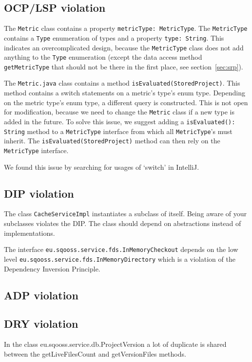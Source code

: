 \documentclass{article}
\begin{document}
\subsection{OCP/LSP violation}
The \verb|Metric| class contains a property \verb|metricType: MetricType|. The \verb|MetricType| contains a \verb|Type| enumeration of types and a property \verb|type: String|. This indicates an overcomplicated design, because the \verb|MetricType| class does not add anything to the \verb|Type| enumeration (except the data access method \verb|getMetricType| that should not be there in the first place, see section~\ref{sec:srp}).

The \verb|Metric.java| class contains a method \verb|isEvaluated(StoredProject)|. This method contains a switch statements on a metric's type's enum type. Depending on the metric type's enum type, a different query is constructed. This is not open for modification, because we need to change the \verb|Metric| class if a new type is added in the future. To solve this issue, we suggest adding a \verb|isEvaluated(): String| method to a \verb|MetricType| interface from which all \verb|MetricType|'s must inherit. The \verb|isEvaluated(StoredProject)| method can then rely on the \verb|MetricType| interface.

We found this issue by searching for usages of `switch' in IntelliJ.

\subsection{DIP violation}
The class \verb|CacheServiceImpl| instantiates a subclass of itself. Being aware of your subclasses violates the DIP. The class should depend on abstractions instead of implementations.

The interface \verb|eu.sqooss.service.fds.InMemoryCheckout| depends on the low level \verb|eu.sqooss.service.fds.InMemoryDirectory| which is a violation of the Dependency Inversion Principle. %

\subsection{ADP violation}

\subsection{DRY violation}
In the class eu.sqooss.service.db.ProjectVersion a lot of duplicate is shared between the getLiveFilesCount and getVersionFiles methods. 
\end{document}
